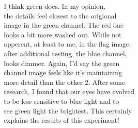 I think green does.  In my opinion,\\
the details feel closest to the origional\\
image in the green channel.  The red one\\
looks a bit more washed out.  While not\\
apperent, at least to me, in the flag image,\\
after additional testing, the blue channel,\\
looks dimmer.  Again, I'd say the green\\
channel image feels like it's maintaining\\
more detail than the other 2.  After some\\
research, I found that our eyes have evolved\\
to be less sensitive to blue light and to\\
see green light the brightest.  This certainly\\
explains the results of this experiment!
